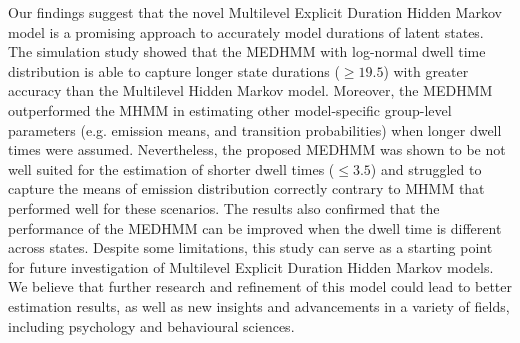Our findings suggest that the novel Multilevel Explicit Duration Hidden Markov model is a promising approach to accurately model durations of latent states. The simulation study showed that the MEDHMM with log-normal dwell time distribution is able to capture longer state durations ($\geq19.5$) with greater accuracy than the Multilevel Hidden Markov model. Moreover, the MEDHMM outperformed the MHMM in estimating other model-specific group-level parameters (e.g. emission means, and transition probabilities) when longer dwell times were assumed. Nevertheless, the proposed MEDHMM was shown to be not well suited for the estimation of shorter dwell times ($\leq3.5$) %
and struggled to capture the means of emission distribution correctly contrary to MHMM that performed well for these scenarios. The results also confirmed that the performance of the MEDHMM can be improved when the dwell time is different across states. Despite some limitations, this study can serve as a starting point for future investigation of Multilevel Explicit Duration Hidden Markov models. We believe that further research and refinement of this model could lead to better estimation results, as well as new insights and advancements in a variety of fields, including psychology and behavioural sciences.